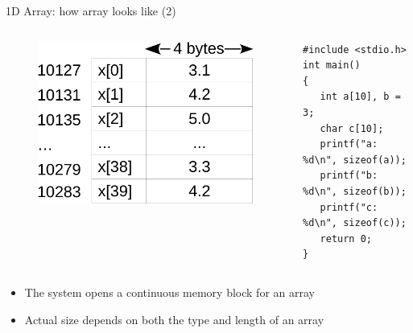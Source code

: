\begin{frame}[fragile]{1D Array: how array looks like (2)}
\begin{columns}
\begin{column}{0.46\linewidth}
\begin{figure}
	\includegraphics[width=0.90\linewidth]{figs/farray.pdf}
\end{figure}
\end{column}
\begin{column}{0.53\linewidth}
\begin{lstlisting}
#include <stdio.h>
int main()
{
   int a[10], b = 3;
   char c[10];
   printf("a: %d\n", sizeof(a));
   printf("b: %d\n", sizeof(b));
   printf("c: %d\n", sizeof(c));
   return 0;
}
\end{lstlisting}
\end{column}
\end{columns}
\vspace{0.1in}
\begin{itemize}
	\item {The system opens a continuous memory block for an array}
	\item {Actual size depends on both the type and length of an array}
\end{itemize}
\end{frame}


